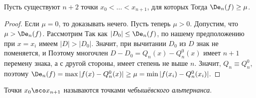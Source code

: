 \documentclass[a4paper]{article}
\begin{document}
\begin{theorem}
Пусть существуют $n+2$ точки $x_0 <\ldots<x_{n+1}$, для которых
Тогда $\De_n(f) \ge \mu$.
\end{theorem}
\begin{proof}
Если $\mu = 0$, то доказывать нечего.
Пусть теперь $\mu > 0$. Допустим, что $\mu > \De_n(f)$.
Рассмотрим
Так как $|D_0| \le \De_n(f)$, по нашему предположению при $x = x_i$ имеем $|D| > |D_0|$.
Значит, при вычитании $D_0$ из $D$ знак не поменяется, и
Поэтому многочлен $D-D_0 = Q_n(x) - Q_n^0(x)$ имеет $n+1$ перемену знака, а с другой стороны, имеет степень не выше $n$.
Значит, $Q_n \equiv Q_n^0$, поэтому $\De_n(f) = \max |f(x)-Q_n^0(x)| \ge \mu = \min |f(x_i)-Q_n^0(x_i)|$.
\end{proof}

\begin{df}
Точки $x_0\sco x_{n+1}$ называются точками \emph{чебышёвского альтернанса}.
\end{df}
\end{document}
